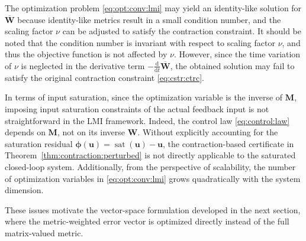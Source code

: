 \documentclass{ifacconf}
\newcommand{\ctxt}[2]{{\color{#1}{#2}\color{black}}}
\newcommand{\cred}[1]{{\ctxt{awesome}{#1}}}
\newcommand*{\mv}[1]{\boldsymbol{#1}} %
\newcommand*{\mm}[1]{\boldsymbol{#1}} %
\DeclareMathOperator{\mysat}{{sat}}       %
\newcommand\der{\mathrm d}
\newcommand*{\ddtt}{
   \tfrac{\der}{\der t}
}
\begin{document}
The optimization problem \eqref{eq:opt:conv:lmi} may yield an identity-like solution for $\overline{\mm W}$ because identity-like metrics result in a small condition number, and the scaling factor $\nu$ can be adjusted to satisfy the contraction constraint.
It should be noted that the condition number is invariant with respect to scaling factor $\nu$, and thus the objective function is not affected by $\nu$.
However, since the time variation of $\nu$ is neglected in the derivative term $-\ddtt\overline{\mm{W}}$, the obtained solution may fail to satisfy the original contraction constraint \eqref{eq:cstr:ctrc}.

In terms of input saturation, since the optimization variable is the inverse of $\mm M$, imposing input saturation constraints of the actual feedback input is not straightforward in the LMI framework.
Indeed, the control law \eqref{eq:control:law} depends on $\mm M$, not on its inverse $\mm W$.
Without explicitly accounting for the saturation residual $\mv\phi(\mv u)=\mysat(\mv u)-\mv u$, the contraction-based certificate in Theorem~\ref{thm:contraction:perturbed} is not directly applicable to the saturated closed-loop system.
Additionally, from the perspective of scalability, the number of optimization variables in \eqref{eq:opt:conv:lmi} grows quadratically with the system dimension.

These issues motivate the vector-space formulation developed in the next section, where the metric-weighted error vector is optimized directly instead of the full matrix-valued metric.


\end{document}
